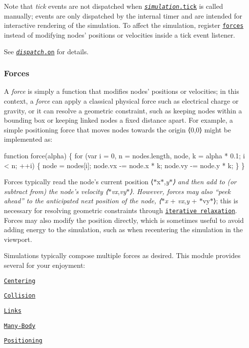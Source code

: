 Note that {\itshape tick} events are not dispatched when \href{#simulation_tick}{\tt {\itshape simulation}.tick} is called manually; events are only dispatched by the internal timer and are intended for interactive rendering of the simulation. To affect the simulation, register \href{#simulation_force}{\tt forces} instead of modifying nodes’ positions or velocities inside a tick event listener.

See \href{https://github.com/d3/d3-dispatch#dispatch_on}{\tt {\itshape dispatch}.on} for details.

\subsubsection*{Forces}

A {\itshape force} is simply a function that modifies nodes’ positions or velocities; in this context, a {\itshape force} can apply a classical physical force such as electrical charge or gravity, or it can resolve a geometric constraint, such as keeping nodes within a bounding box or keeping linked nodes a fixed distance apart. For example, a simple positioning force that moves nodes towards the origin ⟨0,0⟩ might be implemented as\+:


\begin{DoxyCode}
function force(alpha) \{
  for (var i = 0, n = nodes.length, node, k = alpha * 0.1; i < n; ++i) \{
    node = nodes[i];
    node.vx -= node.x * k;
    node.vy -= node.y * k;
  \}
\}
\end{DoxyCode}


Forces typically read the node’s current position ⟨$\ast$x$\ast$,{\itshape y$\ast$⟩ and then add to (or subtract from) the node’s velocity ⟨$\ast$vx},{\itshape vy$\ast$⟩. However, forces may also “peek ahead” to the anticipated next position of the node, ⟨$\ast$x} + {\itshape vx},{\itshape y} + $\ast$vy$\ast$⟩; this is necessary for resolving geometric constraints through \href{https://en.wikipedia.org/wiki/Relaxation_\(iterative_method\)}{\tt iterative relaxation}. Forces may also modify the position directly, which is sometimes useful to avoid adding energy to the simulation, such as when recentering the simulation in the viewport.

Simulations typically compose multiple forces as desired. This module provides several for your enjoyment\+:


\begin{DoxyItemize}
\item \href{#centering}{\tt Centering}
\item \href{#collision}{\tt Collision}
\item \href{#links}{\tt Links}
\item \href{#many-body}{\tt Many-\/\+Body}
\item \href{#positioning}{\tt Positioning}
\end{DoxyItemize}

